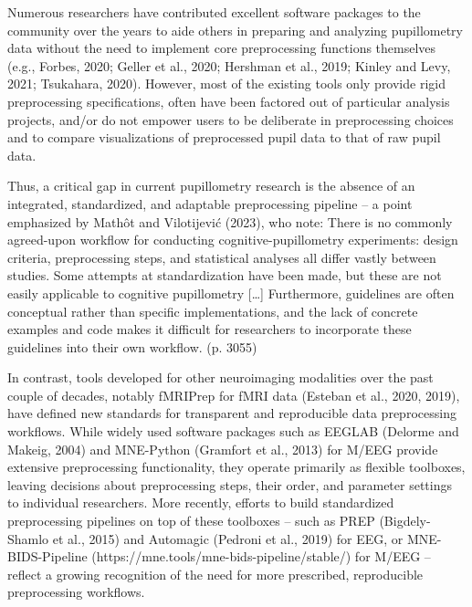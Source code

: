 Numerous researchers have contributed excellent software packages to the community over the years to aide others in preparing and analyzing pupillometry data without the need to implement core preprocessing functions themselves (e.g., Forbes, 2020; Geller et al., 2020; Hershman et al., 2019; Kinley and Levy, 2021; Tsukahara, 2020). However, most of the existing tools only provide rigid preprocessing specifications, often have been factored out of particular analysis projects, and/or do not empower users to be deliberate in preprocessing choices and to compare visualizations of preprocessed pupil data to that of raw pupil data.

Thus, a critical gap in current pupillometry research is the absence of an integrated, standardized, and adaptable preprocessing pipeline – a point emphasized by Mathôt and Vilotijević (2023), who note:
There is no commonly agreed-upon workflow for conducting cognitive-pupillometry experiments: design criteria, preprocessing steps, and statistical analyses all differ vastly between studies. Some attempts at standardization have been made, but these are not easily applicable to cognitive pupillometry […] Furthermore, guidelines are often conceptual rather than specific implementations, and the lack of concrete examples and code makes it difficult for researchers to incorporate these guidelines into their own workflow. (p. 3055)

In contrast, tools developed for other neuroimaging modalities over the past couple of decades, notably fMRIPrep for fMRI data (Esteban et al., 2020, 2019), have defined new standards for transparent and reproducible data preprocessing workflows. While widely used software packages such as EEGLAB (Delorme and Makeig, 2004) and MNE-Python (Gramfort et al., 2013) for M/EEG provide extensive preprocessing functionality, they operate primarily as flexible toolboxes, leaving decisions about preprocessing steps, their order, and parameter settings to individual researchers. More recently, efforts to build standardized preprocessing pipelines on top of these toolboxes – such as PREP (Bigdely-Shamlo et al., 2015) and Automagic (Pedroni et al., 2019) for EEG, or MNE-BIDS-Pipeline (https://mne.tools/mne-bids-pipeline/stable/) for M/EEG – reflect a growing recognition of the need for more prescribed, reproducible preprocessing workflows.

